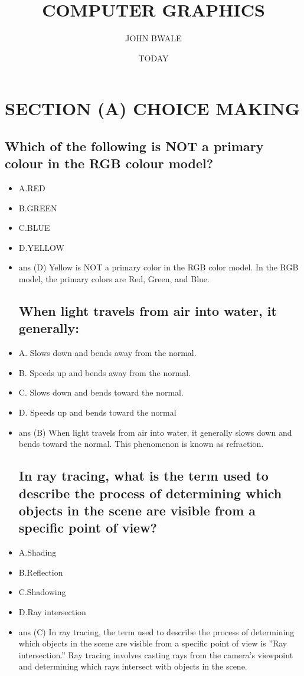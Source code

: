 \documentclass{article}
\author{JOHN BWALE}
\title{COMPUTER GRAPHICS}
\date{TODAY}
\begin{document}
\maketitle
\section{SECTION (A) CHOICE MAKING }
\subsection{Which of the following is NOT a primary colour in the RGB colour model?}
\begin{itemize}
\item A.RED
\item B.GREEN
\item C.BLUE
\item D.YELLOW
\item ans (D) Yellow is NOT a primary color in the RGB color model. In the
RGB model, the primary colors are Red, Green, and Blue.
\subsection{ When light travels from air into water, it generally:}
\item A. Slows down and bends away from the normal.
\item B. Speeds up and bends away from the normal.
\item C. Slows down and bends toward the normal.
\item D. Speeds up and bends toward the normal
\item  ans (B) When light travels from air into water, it generally slows down
and bends toward the normal. This phenomenon is known as refraction.
\subsection{In ray tracing, what is the term used to describe
the process of determining which objects in the scene
are visible from a specific point of view?}
\item A.Shading
\item B.Reflection
\item C.Shadowing
\item D.Ray intersection
\item ans (C) In ray tracing, the term used to describe the process of determining
which objects in the scene are visible from a specific point of view is
”Ray intersection.” Ray tracing involves casting rays from the camera’s
viewpoint and determining which rays intersect with objects in the scene.

\end{itemize}
\end{document}
